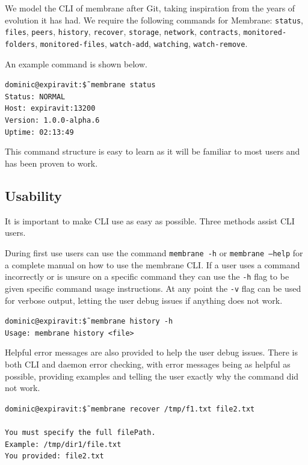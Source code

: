 \documentclass[11pt, a4paper, twoside]{report}
\def\code#1{\texttt{#1}}
\begin{document}
We model the CLI of membrane after Git, taking inspiration from the years of evolution it has had. We require the following commands for Membrane: \code{status}, \code{files}, \code{peers}, \code{history}, \code{recover}, \code{storage}, \code{network}, \code{contracts}, \code{monitored-folders}, \code{monitored-files}, \code{watch-add}, \code{watching}, \code{watch-remove}.

An example command is shown below.

\begin{displayquote}
 \scriptsize
 \code{dominic@expiravit:\~\$ membrane status} \\
 \code{Status:         NORMAL} \\
 \code{Host:           expiravit:13200} \\
 \code{Version:        1.0.0-alpha.6} \\
 \code{Uptime:         02:13:49}
\end{displayquote}

This command structure is easy to learn as it will be familiar to most users and has been proven to work.

\subsection{Usability}

It is important to make CLI use as easy as possible. Three methods assist CLI users.

During first use users can use the command \code{membrane -h} or \code{membrane --help} for a complete manual on how to use the membrane CLI. If a user uses a command incorrectly or is unsure on a specific command they can use the \code{-h} flag to be given specific command usage instructions. At any point the \code{-v} flag can be used for verbose output, letting the user debug issues if anything does not work.

\begin{displayquote}
 \scriptsize
 \code{dominic@expiravit:\~\$ membrane history -h} \\
 \code{Usage: membrane history <file>}
\end{displayquote}

Helpful error messages are also provided to help the user debug issues. There is both CLI and daemon error checking, with error messages being as helpful as possible, providing examples and telling the user exactly why the command did not work.

\begin{displayquote}
 \scriptsize
 \code{dominic@expiravit:\~\$ membrane recover /tmp/f1.txt file2.txt} \\ \\
 \code{You must specify the full filePath.} \\
 \code{Example: /tmp/dir1/file.txt} \\
 \code{You provided: file2.txt}
\end{displayquote}
\end{document}
